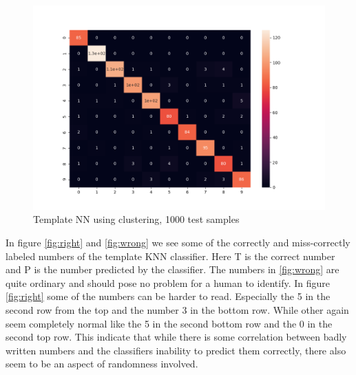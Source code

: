 \documentclass{article}
\begin{document}
\begin{figure}[htbp]
  \centering
  \includegraphics[width=\textwidth]{./confusion_matrices/Cluster_1000.png}
  \caption{Template NN using clustering, 1000 test samples}
  \label{fig:ckustr_1000}
\end{figure}

In figure \ref{fig:right} and \ref{fig:wrong} we see some of the correctly and miss-correctly labeled numbers of the template KNN classifier. Here T is the correct number and P is the number predicted by the classifier. The numbers in \ref{fig:wrong} are quite ordinary and should pose no problem for a human to identify. In figure \ref{fig:right} some of the numbers can be harder to read. Especially the 5 in the second row from the top and the number 3 in the bottom row. While other again seem completely normal like the 5 in the second bottom row and the 0 in the second top row. This indicate that while there is some correlation between badly written numbers and the classifiers inability to predict them correctly, there also seem to be an aspect of randomness involved.
\end{document}
